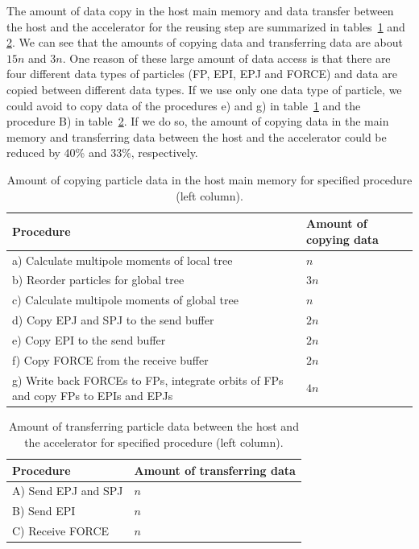 \documentclass[dvipdfmx]{pasj01}
\begin{document}
The amount of data copy in the host main memory and data transfer
between the host and the accelerator for the reusing step are
summarized in tables~\ref{tab:copy_amount} and
\ref{tab:transfer_amount}. We can see that the amounts of copying data
and transferring data are about $15n$ and $3n$. One reason of these
large amount of data access is that there are four different data
types of particles (FP, EPI, EPJ and FORCE) and data are copied
between different data types. If we use only one data type of
particle, we could avoid to copy data of the procedures e) and g) in
table~\ref{tab:copy_amount} and the procedure B) in
table~\ref{tab:transfer_amount}. If we do so, the amount of copying
data in the main memory and transferring data between the host and the
accelerator could be reduced by 40\% and 33\%, respectively.

\begin{table}
  \begin{tabular}{ll}
    \toprule
     Procedure  & Amount of copying data \\
     \midrule
     a) Calculate multipole moments of local tree  & $n$ \\
     b) Reorder particles for global tree          & $3n$ \\
     c) Calculate multipole moments of global tree & $n$ \\
     d) Copy EPJ and SPJ to the send buffer        & $2n$ \\
     e) Copy EPI to the send buffer                & $2n$ \\
     f) Copy FORCE from the receive buffer         & $2n$ \\
     g) Write back FORCEs to FPs, integrate orbits of FPs and copy FPs to EPIs and EPJs & $4n$ \\
  \bottomrule
  \end{tabular}
  \caption{Amount of copying particle data in the host main memory for specified procedure (left column).}
  \label{tab:copy_amount}
\end{table}

\begin{table}
  \begin{tabular}{ll}
    \toprule
     Procedure  & Amount of transferring data \\
     \midrule
     A) Send EPJ and SPJ  & $n$ \\
     B) Send EPI          & $n$ \\
     C) Receive FORCE     & $n$ \\
  \bottomrule
  \end{tabular}
  \caption{Amount of transferring particle data between the host and the accelerator for specified procedure (left column).}
  \label{tab:transfer_amount}
\end{table}
\end{document}
